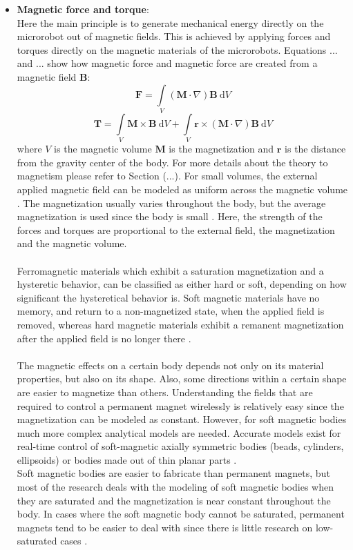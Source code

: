 \begin{itemize}
\item \textbf{Magnetic force and torque}: \\ Here the main principle is to generate mechanical energy directly on the microrobot out of magnetic fields. This is achieved by applying forces and torques directly on the magnetic materials of the microrobots. Equations ... and ... show how magnetic force and magnetic force are created from a magnetic field $\textbf{B}$:
\begin{equation}\label{eq:magdiptorqueint}
\textbf{F} = \int\limits_V(\textbf{M}\cdot\nabla)\textbf{B} \: \mathrm{d}V
\end{equation}
\begin{equation}\label{eq:magdiptorqueint}
\textbf{T} = \int\limits_V\textbf{M}\times\textbf{B}\: \mathrm{d}V + \int\limits_V \textbf{r}\times (\textbf{M}\cdot\nabla)\textbf{B} \: \mathrm{d}V
\end{equation}
where $V$ is the magnetic volume $\textbf{M}$ is the magnetization and $\textbf{r}$ is the distance from the gravity center of the body. For more details about the theory to magnetism please refer to Section (...). For small volumes, the external applied magnetic field can be modeled as uniform across the magnetic volume \cite{Nelson2010}. The magnetization usually varies throughout the body, but the average magnetization is used since the body is small \cite{Nelson2010}. Here, the strength of the forces and torques are proportional to the external field, the magnetization and the magnetic volume. \\\\
Ferromagnetic materials which exhibit a saturation magnetization and a hysteretic behavior, can be classified as either hard or soft, depending on how significant the hysteretical behavior is. Soft magnetic materials have no memory, and return to a non-magnetized state, when the applied field is removed, whereas hard magnetic materials exhibit a remanent magnetization after the applied field is no longer there \cite{Nelson2010}. \\\\
The magnetic effects on a certain body depends not only on its material properties, but also on its shape. Also, some directions within a certain shape are easier to magnetize than others. Understanding the fields that are required to control a permanent magnet wirelessly is relatively easy since the magnetization can be modeled as constant. However, for soft magnetic bodies much more complex analytical models are needed. Accurate models exist for real-time control of soft-magnetic axially symmetric bodies (beads, cylinders, ellipsoids) \cite{Abbott2007c} or bodies made out of thin planar parts \cite{Nagy2008}.\\

Soft magnetic bodies are easier to fabricate than permanent magnets, but most of the research deals with the modeling of soft magnetic bodies when they are saturated and the magnetization is near constant throughout the body. In cases where the soft magnetic body cannot be saturated, permanent magnets tend to be easier to deal with since there is little research on low-saturated cases \cite{Nelson2010}.
\end{itemize}

